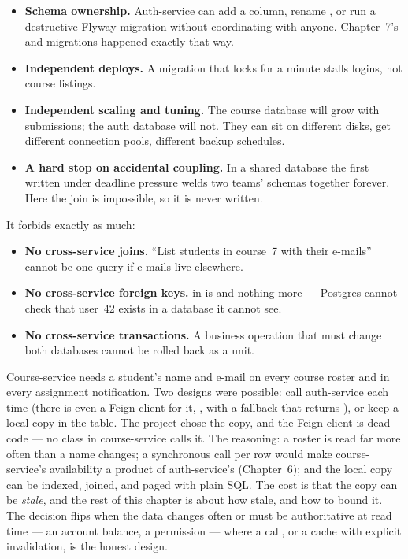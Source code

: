 \begin{itemize}
  \item \textbf{Schema ownership.} Auth-service can add a
   column, rename , or run a
  destructive Flyway migration without coordinating with anyone.
  Chapter~7's  and  migrations happened exactly that
  way.
  \item \textbf{Independent deploys.} A migration that locks
   for a minute stalls logins, not course listings.
  \item \textbf{Independent scaling and tuning.} The course database
  will grow with submissions; the auth database will not. They can sit
  on different disks, get different connection pools, different backup
  schedules.
  \item \textbf{A hard stop on accidental coupling.} In a shared
  database the first 
  written under deadline pressure welds two teams' schemas together
  forever. Here the join is impossible, so it is never written.
\end{itemize}

It forbids exactly as much:

\begin{itemize}
  \item \textbf{No cross-service joins.} ``List students in course~7
  with their e-mails'' cannot be one query if e-mails live elsewhere.
  \item \textbf{No cross-service foreign keys.} 
  in  is  and nothing more --- Postgres cannot check that user~42 exists
  in a database it cannot see.
  \item \textbf{No cross-service transactions.} A business operation
  that must change both databases cannot be rolled back as a unit.
\end{itemize}

\begin{decision}
Course-service needs a student's name and e-mail on every course roster
and in every assignment notification. Two designs were possible: call
auth-service each time (there is even a Feign client for it,
, with a fallback that returns
), or keep a local copy in the  table. The
project chose the copy, and the Feign client is dead code --- no class
in course-service calls it. The reasoning: a roster is read far more
often than a name changes; a synchronous call per row would make
course-service's availability a product of auth-service's (Chapter~6);
and the local copy can be indexed, joined, and paged with plain SQL. The
cost is that the copy can be \emph{stale}, and the rest of this chapter
is about how stale, and how to bound it. The decision flips when the
data changes often or must be authoritative at read time --- an account
balance, a permission --- where a call, or a cache with explicit
invalidation, is the honest design.
\end{decision}

